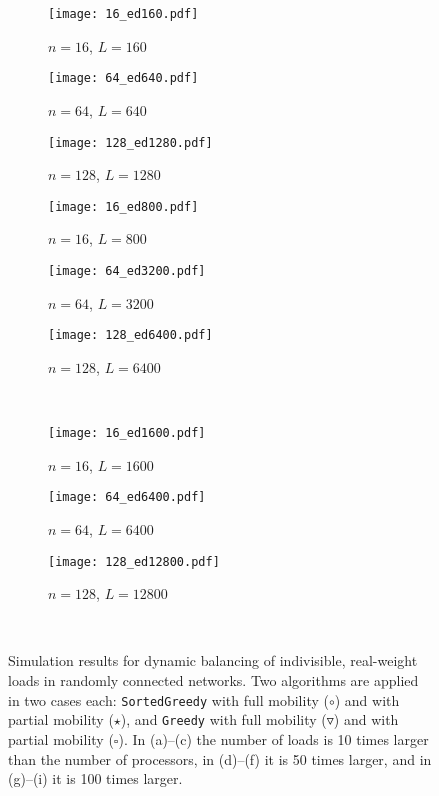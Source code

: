 \documentclass[12pt,psfig,a4]{article}
\newcommand{\sg}{\texttt{SortedGreedy}}
\newcommand{\gr}{\texttt{Greedy}}
\theoremstyle{plain}
\begin{document}
\begin{figure}
\centering	
	\begin{subfigure}[b]{0.32\textwidth}
		\centering
	      	\texttt{[image: 16\_ed160.pdf]}
		\caption{$n=16$, $L=160$}
		\label{fig:16_d160}
	\end{subfigure}
\begin{subfigure}[b]{0.32\textwidth}
		\centering
	      	\texttt{[image: 64\_ed640.pdf]}
		\caption{$n=64$, $L=640$}
		\label{fig:64_d640}
	\end{subfigure}
	\begin{subfigure}[b]{0.32\textwidth}
		\centering
	      	\texttt{[image: 128\_ed1280.pdf]}
		\caption{$n=128$, $L=1280$}
		\label{fig:128_d1280}
	\end{subfigure}
 	
	\begin{subfigure}[b]{0.32\textwidth}
		\centering
	      	\texttt{[image: 16\_ed800.pdf]}
		\caption{$n=16$, $L=800$}
		\label{fig:16_d800}
	\end{subfigure}
\begin{subfigure}[b]{0.32\textwidth}
		\centering
	      	\texttt{[image: 64\_ed3200.pdf]}
		\caption{$n=64$, $L=3200$}
		\label{fig:64_d3200}
	\end{subfigure}
	\begin{subfigure}[b]{0.32\textwidth}
		\centering
	      	\texttt{[image: 128\_ed6400.pdf]}
		\caption{$n=128$, $L=6400$}
		\label{fig:128_d6400}
	\end{subfigure}
	\\
	\begin{subfigure}[b]{0.32\textwidth}
		\centering
	      	\texttt{[image: 16\_ed1600.pdf]}
		\caption{$n=16$, $L=1600$}
		\label{fig:16_d1600}
	\end{subfigure}
\begin{subfigure}[b]{0.32\textwidth}
		\centering
	      	\texttt{[image: 64\_ed6400.pdf]}
		\caption{$n=64$, $L=6400$}
		\label{fig:64_d6400}
	\end{subfigure}
	\begin{subfigure}[b]{0.32\textwidth}
		\centering
	      	\texttt{[image: 128\_ed12800.pdf]}
		\caption{$n=128$, $L=12800$}
		\label{fig:128_d12800}
	\end{subfigure}
	\\

	\caption{Simulation results for dynamic balancing of indivisible, real-weight loads in randomly connected networks. Two algorithms are applied in two cases each: \sg{} with full mobility ($\circ$) and with partial mobility ($\star$), and \gr{} with full mobility ($\triangledown$) and with partial mobility  ($\square$). In (a)--(c) the number of loads is 10 times larger than the number of processors, in (d)--(f) it is 50 times larger, and in (g)--(i) it is 100 times larger.}
	\label{fig:random_con}
\end{figure}
\end{document}
